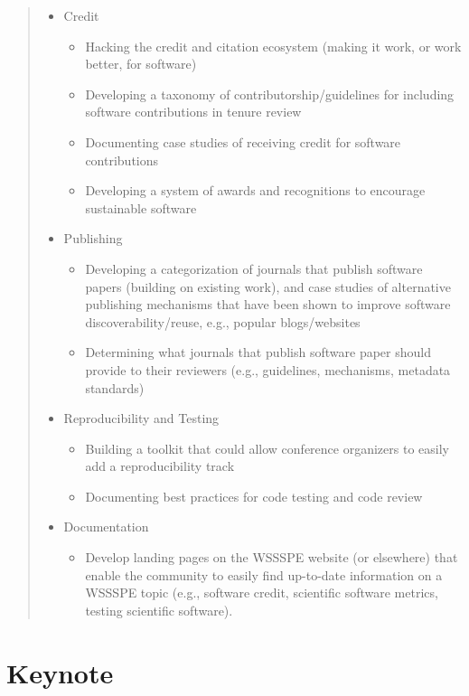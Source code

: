 \documentclass[11pt, oneside]{amsart}
\newcommand{\note}[1]{ {\textcolor{blueish}    { ***Note:      #1 }}}
\begin{document}
\begin{quote}
\begin{itemize}
\item Credit
\begin{itemize}
\item Hacking the credit and citation ecosystem (making it work, or work better,
for software)
\item Developing a taxonomy of contributorship/guidelines for including software
contributions in tenure review
\item Documenting case studies of receiving credit for software contributions
\item Developing a system of awards and recognitions to encourage sustainable
software
\end{itemize}

\item Publishing
\begin{itemize}
\item Developing a categorization of journals that publish software papers
(building on existing work), and case studies of alternative publishing
mechanisms that have been shown to improve software discoverability/reuse, e.g.,
popular blogs/websites
\item Determining what journals that publish software paper should provide to
their reviewers (e.g., guidelines, mechanisms, metadata standards)
\end{itemize}

\item Reproducibility and Testing
\begin{itemize}
\item Building a toolkit that could allow conference organizers to easily add a
reproducibility track
\item Documenting best practices for code testing and code review
\end{itemize}

\item Documentation
\begin{itemize}
\item Develop landing pages on the WSSSPE website (or elsewhere) that enable the
community to easily find up-to-date information on a WSSSPE topic (e.g.,
software credit, scientific software metrics, testing scientific software).
\end{itemize}

\end{itemize}
\end{quote}

\section{Keynote \label{sec:keynote}}
\end{document}
